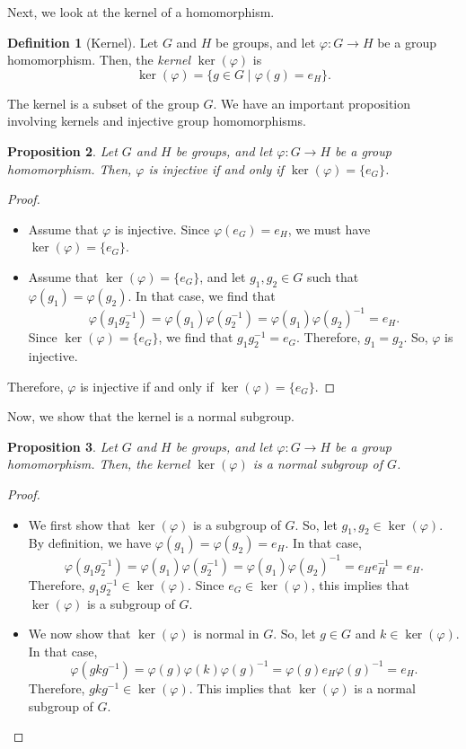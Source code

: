 \documentclass[a4paper, openany]{memoir}
\theoremstyle{definition}
\newtheorem{definition}{Definition}[section]
\theoremstyle{plain}
\newtheorem{proposition}[definition]{Proposition}
\begin{document}
Next, we look at the kernel of a homomorphism.
\begin{definition}[Kernel]
Let $G$ and $H$ be groups, and let $\varphi: G \to H$ be a group homomorphism. Then, the \emph{kernel} $\ker (\varphi)$ is
\[\ker (\varphi) = \{g \in G \mid \varphi(g) = e_H\}.\]
\end{definition}
\noindent The kernel is a subset of the group $G$. We have an important proposition involving kernels and injective group homomorphisms.
\begin{proposition}
Let $G$ and $H$ be groups, and let $\varphi: G \to H$ be a group homomorphism. Then, $\varphi$ is injective if and only if $\ker (\varphi) = \{e_G\}$.
\end{proposition}
\begin{proof}
\hspace*{0pt}
\begin{itemize}
    \item Assume that $\varphi$ is injective. Since $\varphi(e_G) = e_H$, we must have $\ker (\varphi) = \{e_G\}$.
    
    \item Assume that $\ker (\varphi) = \{e_G\}$, and let $g_1, g_2 \in G$ such that $\varphi(g_1) = \varphi(g_2)$. In that case, we find that
    \[\varphi(g_1 g_2^{-1}) = \varphi(g_1) \varphi(g_2^{-1}) = \varphi(g_1) \varphi(g_2)^{-1} = e_H.\]
    Since $\ker (\varphi) = \{e_G\}$, we find that $g_1 g_2^{-1} = e_G$. Therefore, $g_1 = g_2$. So, $\varphi$ is injective.
\end{itemize}
Therefore, $\varphi$ is injective if and only if $\ker (\varphi) = \{e_G\}$.
\end{proof}
\noindent Now, we show that the kernel is a normal subgroup.
\begin{proposition}
Let $G$ and $H$ be groups, and let $\varphi: G \to H$ be a group homomorphism. Then, the kernel $\ker (\varphi)$ is a normal subgroup of $G$.
\end{proposition}
\begin{proof}
\hspace*{0pt}
\begin{itemize}
    \item We first show that $\ker (\varphi)$ is a subgroup of $G$. So, let $g_1, g_2 \in \ker (\varphi)$. By definition, we have $\varphi(g_1) = \varphi(g_2) = e_H$. In that case,
    \[\varphi(g_1 g_2^{-1}) = \varphi(g_1) \varphi(g_2^{-1}) = \varphi(g_1) \varphi(g_2)^{-1} = e_H e_H^{-1} = e_H.\]
    Therefore, $g_1 g_2^{-1} \in \ker (\varphi)$. Since $e_G \in \ker (\varphi)$, this implies that $\ker (\varphi)$ is a subgroup of $G$.
    
    \item We now show that $\ker (\varphi)$ is normal in $G$. So, let $g \in G$ and $k \in \ker (\varphi)$. In that case, 
    \[\varphi(gkg^{-1}) = \varphi(g) \varphi(k) \varphi(g)^{-1} = \varphi(g) e_H \varphi(g)^{-1} = e_H.\]
    Therefore, $gkg^{-1} \in \ker (\varphi)$. This implies that $\ker (\varphi)$ is a normal subgroup of $G$.
\end{itemize}
\end{proof}
\end{document}
